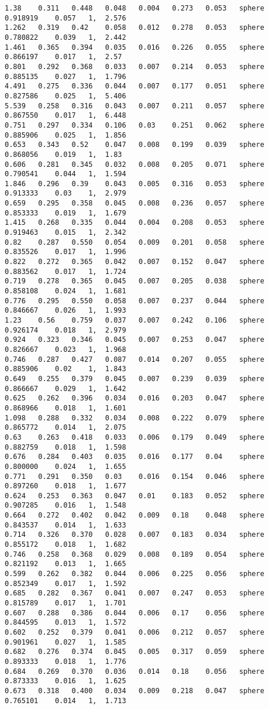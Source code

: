 {\begin{lstlisting}[caption={Datos obtenidos para la prueba de la esfera usando AGC.}]
1.38	0.311	0.448	0.048	0.004	0.273	0.053	sphere	0.918919	0.057	1, 	2.576
1.262	0.319	0.42	0.058	0.012	0.278	0.053	sphere	0.780822	0.039	1, 	2.442
1.461	0.365	0.394	0.035	0.016	0.226	0.055	sphere	0.866197	0.017	1, 	2.57
0.801	0.292	0.368	0.033	0.007	0.214	0.053	sphere	0.885135	0.027	1, 	1.796
4.491	0.275	0.336	0.044	0.007	0.177	0.051	sphere	0.827586	0.025	1, 	5.406
5.539	0.258	0.316	0.043	0.007	0.211	0.057	sphere	0.867550	0.017	1, 	6.448
0.751	0.297	0.334	0.106	0.03	0.251	0.062	sphere	0.885906	0.025	1, 	1.856
0.653	0.343	0.52	0.047	0.008	0.199	0.039	sphere	0.868056	0.019	1, 	1.83
0.606	0.281	0.345	0.032	0.008	0.205	0.071	sphere	0.790541	0.044	1, 	1.594
1.846	0.296	0.39	0.043	0.005	0.316	0.053	sphere	0.913333	0.03	1, 	2.979
0.659	0.295	0.358	0.045	0.008	0.236	0.057	sphere	0.853333	0.019	1, 	1.679
1.415	0.268	0.335	0.044	0.004	0.208	0.053	sphere	0.919463	0.015	1, 	2.342
0.82	0.287	0.550	0.054	0.009	0.201	0.058	sphere	0.835526	0.017	1, 	1.996
0.822	0.272	0.365	0.042	0.007	0.152	0.047	sphere	0.883562	0.017	1, 	1.724
0.719	0.278	0.365	0.045	0.007	0.205	0.038	sphere	0.858108	0.024	1, 	1.681
0.776	0.295	0.550	0.058	0.007	0.237	0.044	sphere	0.846667	0.026	1, 	1.993
1.23	0.56	0.759	0.037	0.007	0.242	0.106	sphere	0.926174	0.018	1, 	2.979
0.924	0.323	0.346	0.045	0.007	0.253	0.047	sphere	0.826667	0.023	1, 	1.968
0.746	0.287	0.427	0.087	0.014	0.207	0.055	sphere	0.885906	0.02	1, 	1.843
0.649	0.255	0.379	0.045	0.007	0.239	0.039	sphere	0.866667	0.029	1, 	1.642
0.625	0.262	0.396	0.034	0.016	0.203	0.047	sphere	0.868966	0.018	1, 	1.601
1.098	0.288	0.332	0.034	0.008	0.222	0.079	sphere	0.865772	0.014	1, 	2.075
0.63	0.263	0.418	0.033	0.006	0.179	0.049	sphere	0.882759	0.018	1, 	1.598
0.676	0.284	0.403	0.035	0.016	0.177	0.04	sphere	0.800000	0.024	1, 	1.655
0.771	0.291	0.350	0.03	0.016	0.154	0.046	sphere	0.897260	0.018	1, 	1.677
0.624	0.253	0.363	0.047	0.01	0.183	0.052	sphere	0.907285	0.016	1, 	1.548
0.664	0.272	0.402	0.042	0.009	0.18	0.048	sphere	0.843537	0.014	1, 	1.633
0.714	0.326	0.370	0.028	0.007	0.183	0.034	sphere	0.855172	0.018	1, 	1.682
0.746	0.258	0.368	0.029	0.008	0.189	0.054	sphere	0.821192	0.013	1, 	1.665
0.599	0.262	0.382	0.044	0.006	0.225	0.056	sphere	0.852349	0.017	1, 	1.592
0.685	0.282	0.367	0.041	0.007	0.247	0.053	sphere	0.815789	0.017	1, 	1.701
0.607	0.288	0.386	0.044	0.006	0.17	0.056	sphere	0.844595	0.013	1, 	1.572
0.602	0.252	0.379	0.041	0.006	0.212	0.057	sphere	0.901961	0.027	1, 	1.585
0.682	0.276	0.374	0.045	0.005	0.317	0.059	sphere	0.893333	0.018	1, 	1.776
0.684	0.269	0.370	0.036	0.014	0.18	0.056	sphere	0.873333	0.016	1, 	1.625
0.673	0.318	0.400	0.034	0.009	0.218	0.047	sphere	0.765101	0.014	1, 	1.713

\end{lstlisting}}
